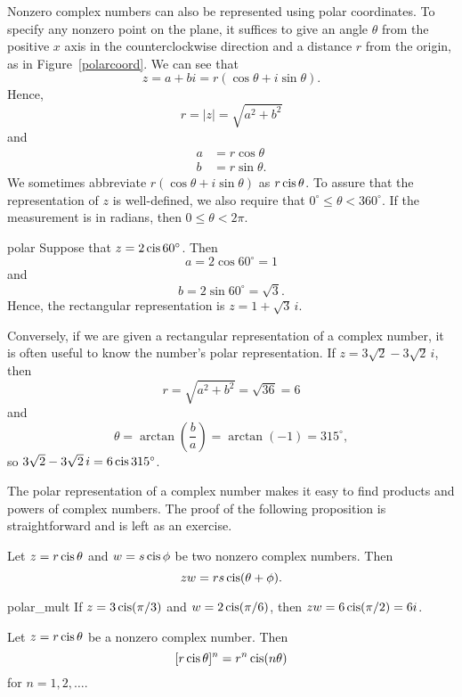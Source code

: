  
Nonzero complex numbers can also be represented using {\bfi polar
coordinates}.  To specify  any nonzero point on the plane, it suffices
to give an angle $\theta$ from the positive $x$ axis in the
counterclockwise direction and a distance $r$ from the origin, as in 
Figure~\ref{polarcoord}. We can see that 
\[
z = a + bi = r( \cos \theta + i \sin \theta).
\]
Hence,
\[
r = |z| = \sqrt{a^2+b^2}
\]
and
\begin{align*}
a & = r \cos \theta \\
b & = r \sin \theta.
\end{align*}
We sometimes abbreviate $r( \cos \theta + i \sin \theta)$ as $r \operatorname{cis}
\theta$\label{cosisin}.  To assure that the representation of $z$ is 
well-defined, we also require that $0^{\circ} \leq \theta <
360^{\circ}$.  If the measurement is in radians, then $0 \leq \theta <
2 \pi$. 
 
\begin{example}{polar}
Suppose that $z = 2 \operatorname{cis}  60^{\circ}$. Then
\[
a  =  2 \cos 60^{\circ}  =   1
\]
and
\[
b  =  2 \sin 60^{\circ}  =  \sqrt{3}.
\]
Hence, the rectangular representation is $z = 1+\sqrt{3}\, i$.
 
 
Conversely, if we are given a rectangular representation of a complex
number, it is often useful to know the number's polar representation.
If $z = 3 \sqrt{2} - 3 \sqrt{2}\, i$, then 
\[
r = \sqrt{a^2 + b^2} = \sqrt{36 } = 6
\]
and
\[
\theta = \arctan \left( \frac{b}{a} \right) = \arctan( - 1) =
315^{\circ},
\]
so $3 \sqrt{2} - 3 \sqrt{2}\, i=6 \operatorname{cis}  315^{\circ}$.
\end{example}
 
 
The polar representation of a complex number makes it easy to find
products and powers of complex numbers.  The proof of the following
proposition is straightforward and is left as an exercise.
 
 
\begin{proposition}\label{polar_mult}
Let $z = r \operatorname{cis} \theta$ and $w = s \operatorname{cis} \phi$
be two nonzero complex numbers. Then 
\[
zw = r s \operatorname{cis}( \theta + \phi).
\]
\end{proposition}
 
 
\begin{example}{polar_mult}
If $z =  3 \operatorname{cis}( \pi / 3 )$ and $w = 2 \operatorname{cis}(\pi / 6 )$, then $zw = 6
\operatorname{cis}( \pi / 2 ) = 6i$.  
\end{example}
 
 
\begin{theorem}[DeMoivre]
Let $z = r \operatorname{cis}  \theta$ be a nonzero complex number. Then 
\[
[r \operatorname{cis} \theta  ]^n
=
r^n \operatorname{cis}( n \theta)
\]
for $n = 1, 2, \ldots$.
\end{theorem}
 
